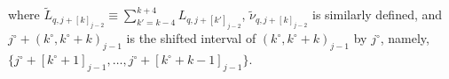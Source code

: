 \documentclass[aos]{imsart}
\begin{document}
\begin{appendix}
where $\tilde{L}_{q,j+[k]_{j-2}} \equiv \sum_{k'=k-4}^{k+4} L_{q,j+[k']_{j-2}}$, $\tilde\nu_{q,j+[k]_{j-2}}$ is similarly defined, and $j^\circ+(k^\circ,k^\circ+k)_{j-1}$ is the shifted interval of $(k^\circ,k^\circ+k)_{j-1}$ by $j^\circ$, namely, $\{j^\circ+[k^\circ+1]_{j-1}, \dots, j^\circ+[k^\circ+k-1]_{j-1}\}$. 





\end{appendix}
\end{document}
